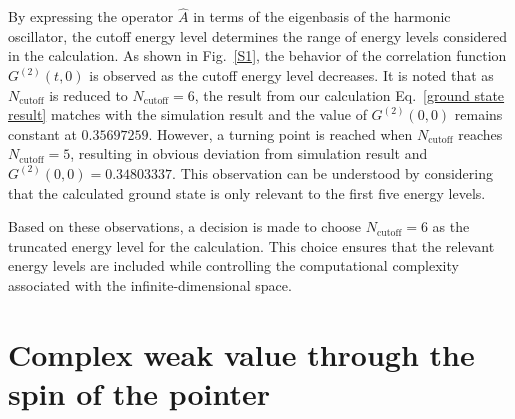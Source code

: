 \documentclass[twocolumn,pra,aps,superscriptaddress]{revtex4-2}
\begin{document}
By expressing the operator $\hat{A}$ in terms of the eigenbasis of the harmonic oscillator, the cutoff energy level determines the range of energy levels considered in the calculation.  As shown in Fig.~\ref{S1}, the behavior of the correlation function $G^{(2)}(t,0)$ is observed as the cutoff energy level decreases.  It is noted that as $N_{\text{cutoff}}$ is reduced to $N_{\text{cutoff}}=6$, the result from our calculation Eq.~\eqref{ground state result} matches with the simulation result and the value of $G^{(2)}(0,0)$ remains constant at $0.35697259$. However, a turning point is reached when $N_{\text{cutoff}}$ reaches $N_{\text{cutoff}}=5$, resulting in  obvious deviation from simulation result and $G^{(2)}(0,0)=0.34803337$. This observation can be understood by considering that the calculated ground state is only relevant to the first five energy levels.

Based on these observations, a decision is made to choose $N_{\text{cutoff}}=6$ as the truncated energy level for the calculation. This choice ensures that the relevant energy levels are included while controlling the computational complexity associated with the infinite-dimensional space.


\section{Complex weak value through the spin of the pointer}\label{CWVD}
\end{document}
